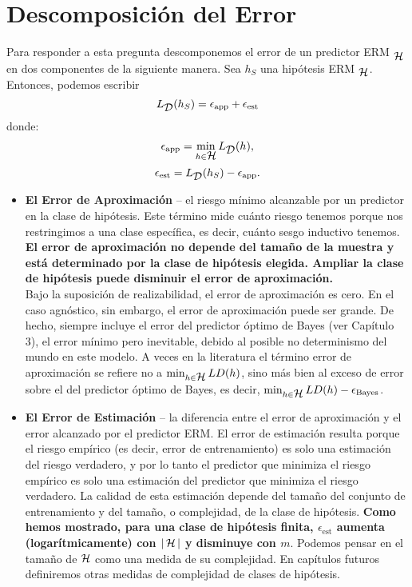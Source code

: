 \section{Descomposición del Error}
Para responder a esta pregunta descomponemos el error de un predictor ERM $_{\mathop{\mbox{$\mathcal{H}$}}\nolimits}$ en dos componentes de la siguiente manera. Sea $h_S$ una hipótesis ERM $_{\mathop{\mbox{$\mathcal{H}$}}\nolimits}$. Entonces, podemos escribir
$$ L_{\mathop{\mbox{$\mathcal{D}$}}\nolimits}(h_S) = \epsilon_{\text{app}} + \epsilon_{\text{est}} $$
donde:
$$ \epsilon_{\text{app}} = \min_{h \in \mathop{\mbox{$\mathcal{H}$}}\nolimits} L_{\mathop{\mbox{$\mathcal{D}$}}\nolimits}(h), $$
$$ \epsilon_{\text{est}} = L_{\mathop{\mbox{$\mathcal{D}$}}\nolimits}(h_S) - \epsilon_{\text{app}}. $$
\begin{itemize}
    \item \textbf{El Error de Aproximación} – el riesgo mínimo alcanzable por un predictor en la clase de hipótesis. Este término mide cuánto riesgo tenemos porque nos restringimos a una clase específica, es decir, cuánto sesgo inductivo tenemos. \textbf{El error de aproximación no depende del tamaño de la muestra y está determinado por la clase de hipótesis elegida. Ampliar la clase de hipótesis puede disminuir el error de aproximación.}\\

  Bajo la suposición de realizabilidad, el error de aproximación es cero. En el caso agnóstico, sin embargo, el error de aproximación puede ser grande.
  De hecho, siempre incluye el error del predictor óptimo de Bayes (ver Capítulo 3), el error mínimo pero inevitable, debido al posible no determinismo del mundo en este modelo. A veces en la literatura el término error de aproximación se refiere no a $\min_{h \in \mathop{\mbox{$\mathcal{H}$}}\nolimits} LD(h)$, sino más bien al exceso de error sobre el del predictor óptimo de Bayes,
  es decir, $\min_{h \in \mathop{\mbox{$\mathcal{H}$}}\nolimits} LD(h) - \epsilon_{\text{Bayes}}$.
  
    \item \textbf{El Error de Estimación} – la diferencia entre el error de aproximación y el error alcanzado por el predictor ERM. El error de estimación resulta porque el riesgo empírico (es decir, error de entrenamiento) es solo una estimación del riesgo verdadero, y por lo tanto el predictor que minimiza el riesgo empírico es solo una estimación del predictor que minimiza el riesgo verdadero.
	La calidad de esta estimación depende del tamaño del conjunto de entrenamiento y del tamaño, o complejidad, de la clase de hipótesis. \textbf{Como hemos mostrado, para una clase de hipótesis finita, $\epsilon_{\text{est}}$ aumenta (logarítmicamente) con $|\mathop{\mbox{$\mathcal{H}$}}\nolimits|$ y disminuye con $m$}. Podemos pensar en el tamaño de $\mathop{\mbox{$\mathcal{H}$}}\nolimits$ como una medida de su complejidad.
      En capítulos futuros definiremos otras medidas de complejidad de clases de hipótesis.
\end{itemize}

